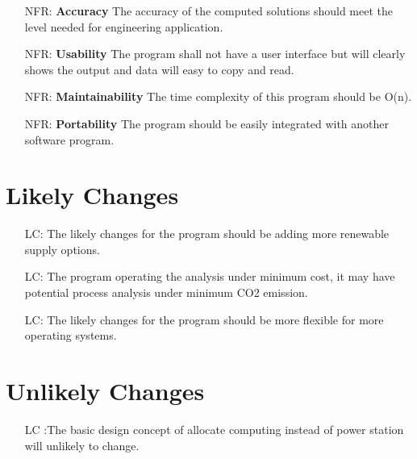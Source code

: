 \documentclass[12pt]{article}
\newcounter{nfrnum} %
\newcounter{lcnum} %
\begin{document}
\noindent \begin{itemize}

\item[NFR\refstepcounter{nfrnum}\thenfrnum \label{NFR_Accuracy}:]
  \textbf{Accuracy} {The accuracy of the computed
    solutions should meet the level needed for engineering application.}

\item[NFR\refstepcounter{nfrnum}\thenfrnum \label{NFR_Usability}:] \textbf{Usability}
  {The program shall not have a user interface but will clearly shows the output and data will easy to copy and read.}

\item[NFR\refstepcounter{nfrnum}\thenfrnum \label{NFR_Maintainability}:]
  \textbf{Maintainability} {The time complexity of this program should be O(n).}

\item[NFR\refstepcounter{nfrnum}\thenfrnum \label{NFR_Portability}:]
  \textbf{Portability} {The program should be easily integrated with another software program.}


\end{itemize}

\section{Likely Changes}    

\noindent \begin{itemize}

\item[LC\refstepcounter{lcnum}\thelcnum\label{LC_meaningfulLabel}:] {The likely changes for the program should be adding more renewable supply options.}
\item[LC\refstepcounter{lcnum}\thelcnum\label{LC_meaningfulLabel}:] {The program operating the analysis under minimum cost, it may have potential process analysis under minimum CO2 emission.}
\item[LC\refstepcounter{lcnum}\thelcnum\label{LC_meaningfulLabel}:] {The likely changes for the program should be more flexible for more operating systems.}
\end{itemize}

\section{Unlikely Changes}    

\noindent \begin{itemize}

\item[LC\refstepcounter{lcnum}\thelcnum\label{LC_meaningfulLabel}]:{The basic design concept of allocate computing instead of power station will unlikely to change.}

\end{itemize}
\end{document}

